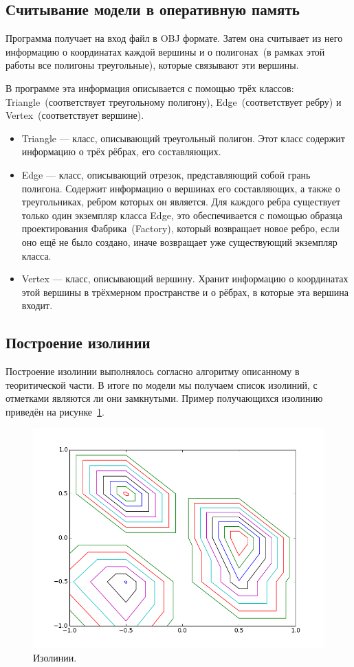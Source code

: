 \documentclass[12pt,a4paper,oneside]{extarticle}
\begin{document}
    \subsection{Считывание модели в оперативную память}
        Программа получает на вход файл в OBJ формате. Затем она считывает из него информацию о координатах каждой вершины и о полигонах~(в рамках этой работы все полигоны треугольные), которые связывают эти вершины.

        В программе эта информация описывается с помощью трёх классов: Triangle~(соответствует треугольному полигону), Edge~(соответствует ребру) и Vertex~(соответствует вершине).
        \begin{itemize}
            \item Triangle --- класс, описывающий треугольный полигон. Этот класс содержит информацию о трёх рёбрах, его составляющих.
            \item Edge --- класс, описывающий отрезок, представляющий собой грань полигона. Содержит информацию о вершинах его составляющих, а также о треугольниках, ребром которых он является. Для каждого ребра существует только один экземпляр класса Edge, это обеспечивается с помощью образца проектирования Фабрика~(Factory), который возвращает новое ребро, если оно ещё не было создано, иначе возвращает уже существующий экземпляр класса.
            \item Vertex --- класс, описывающий вершину. Хранит информацию о координатах этой вершины в трёхмерном пространстве и о рёбрах, в которые эта вершина входит.
        \end{itemize}
    \clearpage    
    \subsection{Построение изолинии}
        Построение изолинии выполнялось согласно алгоритму описанному в теоритической части. В итоге по модели мы получаем список изолиний, с отметками являются ли они замкнутыми. Пример получающихся изолинию приведён на рисунке~\ref{pic:isoline}.

        \begin{figure}[h!]
            \center
            \includegraphics[scale=0.7]{isoline.png}
            \caption{Изолинии.}
            \label{pic:isoline}
        \end{figure}
\end{document}
